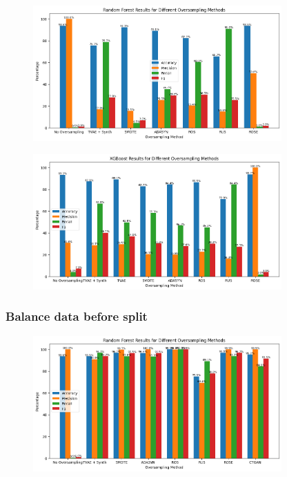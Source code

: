 \documentclass[twoside,11pt]{article}
\begin{document}
\begin{figure}
  \centering
  \includegraphics[width=0.85\textwidth]{images/rf_oversample_after_split.png}
  \caption{}
  \label{fig:rf_oversample_after_split}
\end{figure}

\begin{figure}
  \centering
  \includegraphics[width=0.85\textwidth]{images/xgboost_oversample_after_split.png}
  \caption{}
  \label{fig:xgboost_oversample_after_split}
\end{figure}

\subsubsection{Balance data before split}

\begin{figure}
  \centering
  \includegraphics[width=0.85\textwidth]{images/rf_oversample_before_slit.png}
  \caption{}
  \label{fig:rf_oversample_after_split}
\end{figure}
\end{document}
